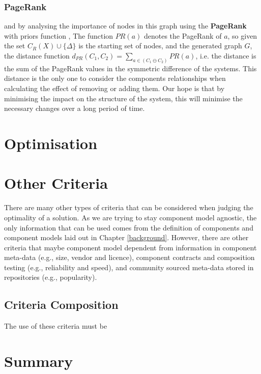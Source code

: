 \subsubsection{PageRank}

and by analysing the importance of nodes in this graph using the \textbf{PageRank} with priors function \cite{White:2003:AER:956750.956782}, 
The function $PR(a)$ denotes the PageRank of $a$,
so given the set $C_R(X) \cup \{\Delta\}$ is the starting set of nodes, and the generated graph $G$,
the distance function $d_{PR}(C_1,C_2) = \sum_{a \in (C_1 \ominus C_2)} PR(a)$,
i.e. the distance is the sum of the PageRank values in the symmetric difference of the systems.
This distance is the only one to consider the components relationships when calculating the effect of removing or adding them.
Our hope is that by minimising the impact on the structure of the system, 
this will minimise the necessary changes over a long period of time.



\section{Optimisation}

\section{Other Criteria}
{}There are many other types of criteria that can be considered when judging the optimality of a solution.
{}As we are trying to stay component model agnostic, the only information that can be used comes from the definition of components and component models laid out in Chapter \ref{background}.
{}However, there are other criteria that maybe component model dependent from information in component meta-data (e.g., size, vendor and licence),
{}component contracts and composition testing (e.g., reliability and speed),
{}and community sourced meta-data stored in repositories (e.g., popularity).




\subsection{Criteria Composition}
The use of these criteria must be 

\section{Summary}

